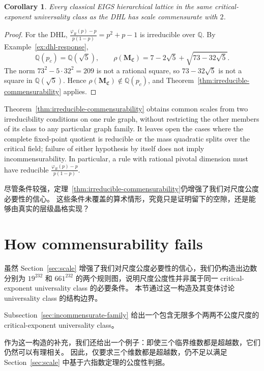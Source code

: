\documentclass[scheme=plain,11pt]{ctexart}
\newtheorem{corollary}[theorem]{Corollary}
\theoremstyle{definition}
\theoremstyle{remark}
\begin{document}
\begin{corollary}\label{cor:diamond-commensurability}\label{ex:diamond-irreducibility}
Every classical EIGS hierarchical lattice in the same critical-exponent universality class as the DHL has scale commensurate with $2$.
\end{corollary}
\begin{proof}
For the DHL, $\frac{\varphi_R(p)-p}{p(1-p)}=p^2+p-1$ is irreducible over $\mathbb Q$.
By Example~\ref{ex:dhl-response},
\[
 \mathbb Q(p_c)=\mathbb Q(\sqrt5),\qquad
 \rho(\mathbf M_{\mathfrak C})=7-2\sqrt5+\sqrt{73-32\sqrt5}.
\]
The norm $73^2-5\cdot32^2=209$ is not a rational square, so $73-32\sqrt5$ is not a square in $\mathbb Q(\sqrt5)$.
Hence $\rho(\mathbf M_{\mathfrak C})\notin\mathbb Q(p_c)$, and Theorem~\ref{thm:irreducible-commensurability} applies.
\end{proof}

Theorem~\ref{thm:irreducible-commensurability} obtains common scales from two irreducibility conditions on one rule graph, without restricting the other members of its class to any particular graph family.
It leaves open the cases where the complete fixed-point quotient is reducible or the mass quadratic splits over the critical field; failure of either hypothesis by itself does not imply incommensurability.
In particular, a rule with rational pivotal dimension must have reducible $\frac{\varphi_R(p)-p}{p(1-p)}$.



尽管条件较强，定理~\ref{thm:irreducible-commensurability}仍增强了我们对尺度公度必要性的信心。
这些条件未覆盖的算术情形，究竟只是证明留下的空隙，还是能够由真实的层级晶格实现？



\section{How commensurability fails}\label{sec:counterexample}

虽然 Section~\ref{sec:scale} 增强了我们对尺度公度必要性的信心，我们仍构造出边数分别为 $19^{232}$ 和 $661^{232}$ 的两个规则图，说明尺度公度性并非属于同一 critical-exponent universality class 的必要条件。
本节通过这一构造及其变体讨论 universality class 的结构边界。


Subsection~\ref{sec:incommensurate-family} 给出一个包含无限多个两两不公度尺度的 critical-exponent universality class。

作为这一构造的补充，我们还给出一个例子：即使三个临界维数都是超越数，它们仍然可以有理相关。
因此，仅要求三个维数都是超越数，仍不足以满足 Section~\ref{sec:scale} 中基于六指数定理的公度性判据。
\end{document}
